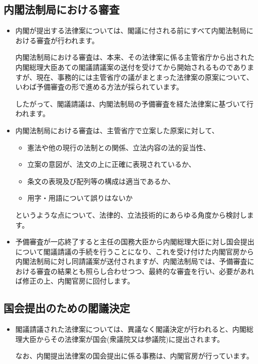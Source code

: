 \subsection {内閣法制局における審査}
\begin {itemize}
\item 内閣が提出する法律案については、閣議に付される前にすべて内閣法制局における審査が行われます。\par
  内閣法制局における審査は、本来、その法律案に係る主管省庁から出された内閣総理大臣あての閣議請議案の送付を受けてから開始されるものでありますが、現在、事務的には主管省庁の議がまとまった法律案の原案について、いわば予備審査の形で進める方法が採られています。\par
  したがって、閣議請議は、内閣法制局の予備審査を経た法律案に基づいて行われます。\par
\item 内閣法制局における審査は、主管省庁で立案した原案に対して、\par
  \begin {itemize}
  \item 憲法や他の現行の法制との関係、立法内容の法的妥当性、\par
  \item 立案の意図が、法文の上に正確に表現されているか、\par
  \item 条文の表現及び配列等の構成は適当であるか、\par
  \item 用字・用語について誤りはないか\par
  \end {itemize}
  というような点について、法律的、立法技術的にあらゆる角度から検討します。\par
\item 予備審査が一応終了すると主任の国務大臣から内閣総理大臣に対し国会提出について閣議請議の手続を行うことになり、これを受け付けた内閣官房から内閣法制局に対し同請議案が送付されますが、内閣法制局では、予備審査における審査の結果とも照らし合わせつつ、最終的な審査を行い、必要があれば修正の上、内閣官房に回付します。\par
\end {itemize}

\subsection {国会提出のための閣議決定}
\begin {itemize}
\item 閣議請議された法律案については、異議なく閣議決定が行われると、内閣総理大臣からその法律案が国会(衆議院又は参議院)に提出されます。\par
  なお、内閣提出法律案の国会提出に係る事務は、内閣官房が行っています。\par
\end {itemize}

